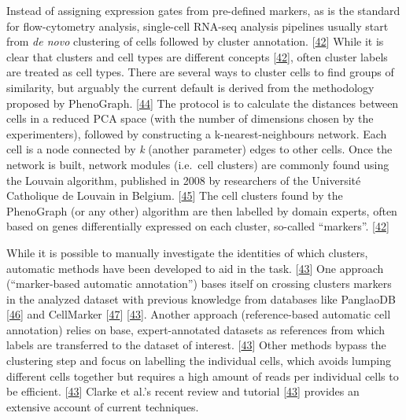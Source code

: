 Instead of assigning expression gates from pre-defined markers, as is the standard for flow-cytometry analysis, single-cell RNA-seq analysis pipelines usually start from \emph{de novo} clustering of cells followed by cluster annotation. {[}\protect\hyperlink{ref-WKbly37M}{42}{]}
While it is clear that clusters and cell types are different concepts {[}\protect\hyperlink{ref-WKbly37M}{42}{]}, often cluster labels are treated as cell types.
There are several ways to cluster cells to find groups of similarity, but arguably the current default is derived from the methodology proposed by PhenoGraph. {[}\protect\hyperlink{ref-pEJYKNFc}{44}{]}
The protocol is to calculate the distances between cells in a reduced PCA space (with the number of dimensions chosen by the experimenters), followed by constructing a k-nearest-neighbours network.
Each cell is a node connected by \emph{k} (another parameter) edges to other cells.
Once the network is built, network modules (i.e.~cell clusters) are commonly found using the Louvain algorithm, published in 2008 by researchers of the Université Catholique de Louvain in Belgium. {[}\protect\hyperlink{ref-JpCsfe9G}{45}{]}
The cell clusters found by the PhenoGraph (or any other) algorithm are then labelled by domain experts, often based on genes differentially expressed on each cluster, so-called ``markers''. {[}\protect\hyperlink{ref-WKbly37M}{42}{]}

While it is possible to manually investigate the identities of which clusters, automatic methods have been developed to aid in the task. {[}\protect\hyperlink{ref-ii1dVqoy}{43}{]}
One approach (``marker-based automatic annotation'') bases itself on crossing clusters markers in the analyzed dataset with previous knowledge from databases like PanglaoDB {[}\protect\hyperlink{ref-1GezH4XNn}{46}{]} and CellMarker {[}\protect\hyperlink{ref-chGii6yw}{47}{]} {[}\protect\hyperlink{ref-ii1dVqoy}{43}{]}.
Another approach (reference-based automatic cell annotation) relies on base, expert-annotated datasets as references from which labels are transferred to the dataset of interest. {[}\protect\hyperlink{ref-ii1dVqoy}{43}{]}
Other methods bypass the clustering step and focus on labelling the individual cells, which avoids lumping different cells together but requires a high amount of reads per individual cells to be efficient. {[}\protect\hyperlink{ref-ii1dVqoy}{43}{]}
Clarke et al.'s recent review and tutorial {[}\protect\hyperlink{ref-ii1dVqoy}{43}{]} provides an extensive account of current techniques.

